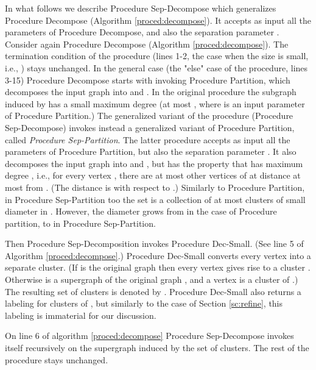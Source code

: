 \documentclass[11pt]{article}
\begin{document}
In what follows we describe Procedure Sep-Decompose which generalizes Procedure Decompose (Algorithm \ref{proced:decompose}). It accepts as input all the parameters of Procedure Decompose, and also the separation parameter . Consider again Procedure Decompose (Algorithm \ref{proced:decompose}). The termination condition of the procedure (lines 1-2, the case when the size  is small, i.e., ) stays unchanged. In the general case (the "else" case of the procedure, lines 3-15) Procedure Decompose starts with invoking Procedure Partition, which decomposes the input graph  into  and . In the original procedure the subgraph  induced by  has a small maximum degree (at most , where  is an input parameter of Procedure Partition.) The generalized variant of the procedure (Procedure Sep-Decompose) invokes instead a generalized variant of Procedure Partition, called {\em Procedure Sep-Partition}. The latter procedure accepts as input all the parameters of Procedure Partition, but also the separation parameter . It also decomposes the input graph  into  and , but  has the property that  has maximum degree , i.e., for every vertex , there are at most  other vertices of  at distance at most  from . (The distance is with respect to .) Similarly to Procedure Partition, in Procedure Sep-Partition too the set  is a collection of at most  clusters of small diameter in . However, the diameter grows from  in the case of Procedure partition, to  in Procedure Sep-Partition.

Then Procedure Sep-Decomposition invokes Procedure Dec-Small. (See line 5 of Algorithm \ref{proced:decompose}.)
Procedure Dec-Small converts every vertex  into a separate cluster. (If  is the original graph  then every vertex  gives rise to a cluster . Otherwise  is a supergraph of the original graph , and a vertex  is a cluster of .) The resulting set of clusters is denoted by . Procedure Dec-Small also returns a labeling for clusters of , but similarly to the case of Section \ref{sc:refine}, this labeling is immaterial for our discussion.

On line 6 of algorithm \ref{proced:decompose} Procedure Sep-Decompose invokes itself recursively on the supergraph  induced by the set  of clusters. The rest of the procedure stays unchanged.
\end{document}
